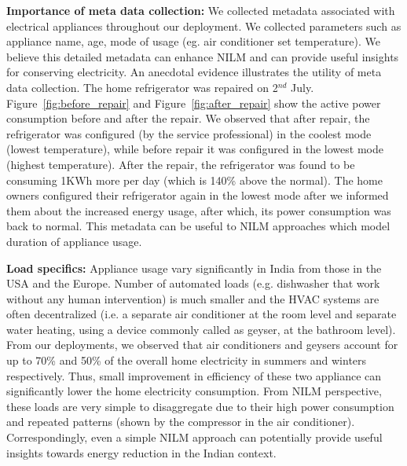 \documentclass[10pt]{sensys-proc}
\newcommand{\redcolor}[1]{\textcolor{red}{#1}}
\newcommand{\figref}[1]{Figure~\ref{#1}}
\begin{document}
\noindent \textbf{Importance of meta data collection:} We collected metadata associated with electrical appliances throughout our deployment. We collected parameters such as appliance name, age, mode of usage (eg. air conditioner set temperature). We believe this detailed metadata can enhance NILM and can provide useful insights for conserving electricity. An anecdotal evidence illustrates the utility of meta data collection. The home refrigerator was repaired on 2$^{nd}$ July. \figref{fig:before_repair} and \figref{fig:after_repair} show the active power consumption before and after the repair. We observed that after repair, the refrigerator was configured (by the service professional) in the coolest mode (lowest temperature), while before repair it was configured in the lowest mode (highest temperature). After the repair, the refrigerator was found to be consuming 1KWh more per day (which is 140\% above the normal). The home owners configured their refrigerator again in the lowest mode after we informed them about the increased energy usage, after which, its power consumption was back to normal. 
This metadata can be useful to NILM approaches which model duration of appliance usage. 

\noindent \textbf{Load specifics:} Appliance usage vary significantly in India from those in the USA and the Europe. Number of automated loads (e.g. dishwasher that work without any human intervention) is much smaller and the HVAC systems are often decentralized (i.e. a separate air conditioner at the room level and separate water heating, using a device commonly called as geyser, at the bathroom level). From our deployments, we observed that air conditioners and geysers account for up to 70\% and 50\% of the overall home electricity in summers and winters respectively. Thus, small improvement in efficiency of these two appliance can significantly lower the home electricity consumption. From NILM perspective, these loads are very simple to disaggregate due to their high power consumption and repeated patterns (shown by the compressor in the air conditioner). Correspondingly, even a simple NILM approach can potentially provide useful insights towards energy reduction in the Indian context.
\end{document}
